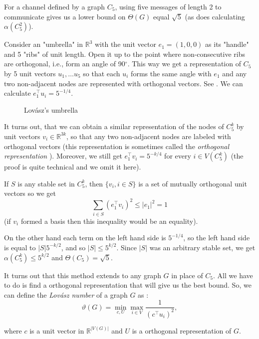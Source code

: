 For a channel defined by a graph $C_5$, using five messages of length 2 to communicate gives us a lower bound on $\Theta(G)$ equal $\sqrt{5}$ (as does calculating $\alpha(C_5^2)$).

Consider an "umbrella" in $\mathbb{R}^3$ with the unit vector $e_1 = (1, 0, 0)$ as its "handle" and 5 "ribs" of unit length.  Open it up to the point where non-consecutive ribs are orthogonal, i.e., form an angle of 90$^\circ$. This way we get a representation of $C_5$ by 5 unit vectors $u_1, \ldots u_5$ so that each $u_i$ forms the same angle with $e_1$ and any two non-adjacent nodes are represented with orthogonal vectors. See . We can calculate $e_1^\intercal u_i = 5 ^ {-1/4}$.


\begin{wrapfigure}{l}{0.4\textwidth}
  
  \caption{Lovász's umbrella}
  \label{fig:umbrella}
\end{wrapfigure}

It turns out, that we can obtain a similar representation of the nodes of $C_5^k$ by unit vectors $v_i \in \mathbb{R}^{3k}$, so that any two non-adjacent nodes are labeled with orthogonal vectors (this representation is sometimes called the \emph{orthogonal representation} \cite{Lovsz1989Orthogonal}). Moreover, we still get $e_1^\intercal v_i = 5^{-k/4}$ for every $i \in V(C_5^k)$ (the proof is quite technical and we omit it here).

If $S$ is any stable set in $C_5^k$, then $\{v_i, i \in S\}$ is a set of mutually orthogonal unit vectors so we get 
$$\sum\limits_{i\in S}(e_1^\intercal v_i)^2 \leq |e_1|^2 = 1$$
(if $v_i$ formed a basis then this inequality would be an equality).

On the other hand each term on the left hand side is $5^{-1/4}$, so the left hand side is equal to $|S|5^{-k/2}$, and so $|S| \leq 5^{k/2}$. Since $|S|$ was an arbitrary stable set, we get $\alpha(C_5^k) \leq 5 ^{k/2}$ and $\Theta(C_5) = \sqrt{5}$.

It turns out that this method extends to any graph $G$ in place of $C_5$. All we have to do is find a orthogonal representation that will give us the best bound. So, we can define the \emph{Lovász number} of a graph $G$ as :
$$\vartheta(G) = \min\limits_{c,U} \max\limits_{i\in V} \frac{1}{(c^\intercal u_i)^2},$$

\noindent where $c$ is a unit vector in $\mathbb{R}^{|V(G)|}$ and $U$ is a orthogonal representation of $G$.

